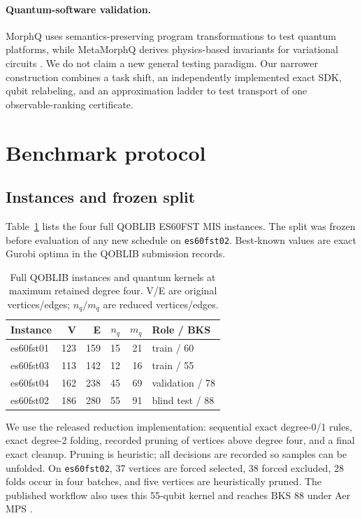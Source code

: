 \documentclass[10pt,twocolumn]{article}
\begin{document}
\paragraph{Quantum-software validation.}
MorphQ uses semantics-preserving program transformations to test quantum
platforms, while MetaMorphQ derives physics-based invariants for variational
circuits \cite{morphq,metamorphq}. We do not claim a new general testing
paradigm. Our narrower construction combines a task shift, an independently
implemented exact SDK, qubit relabeling, and an approximation ladder to test
transport of one observable-ranking certificate.

\section{Benchmark protocol}

\subsection{Instances and frozen split}

Table~\ref{tab:instances} lists the four full QOBLIB ES60FST MIS instances.
The split was frozen before evaluation of any new schedule on
\texttt{es60fst02}. Best-known values are exact Gurobi optima in the QOBLIB
submission records.

\begin{table}[t]
\centering
\caption{Full QOBLIB instances and quantum kernels at maximum retained degree
four. V/E are original vertices/edges; $n_q/m_q$ are reduced vertices/edges.}
\label{tab:instances}
\small
\begin{tabular}{lrrrrl}
\toprule
Instance & V & E & $n_q$ & $m_q$ & Role / BKS \\
\midrule
es60fst01 & 123 & 159 & 15 & 21 & train / 60 \\
es60fst03 & 113 & 142 & 12 & 16 & train / 55 \\
es60fst04 & 162 & 238 & 45 & 69 & validation / 78 \\
es60fst02 & 186 & 280 & 55 & 91 & blind test / 88 \\
\bottomrule
\end{tabular}
\end{table}

We use the released reduction implementation: sequential exact degree-0/1
rules, exact degree-2 folding, recorded pruning of vertices above degree four,
and a final exact cleanup. Pruning is heuristic; all decisions are recorded so
samples can be unfolded. On \texttt{es60fst02}, 37 vertices are forced selected,
38 forced excluded, 28 folds occur in four batches, and five vertices are
heuristically pruned. The published workflow also uses this 55-qubit kernel and
reaches BKS 88 under Aer MPS \cite{qoblibmps}.
\end{document}
